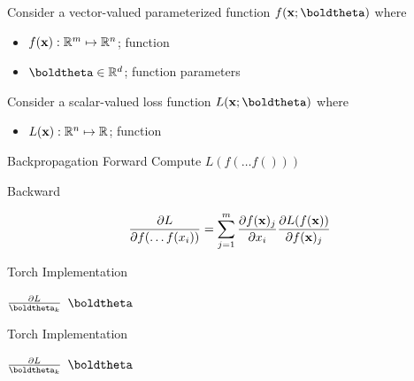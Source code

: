\documentclass{beamer}
\begin{document}
\begin{frame}
  Consider a vector-valued parameterized function  $f(\boldx;\boldtheta)$ where 
  
  \begin{itemize}
  \item $f(\mathbf{x}): \mathbb{R}^m \mapsto \mathbb{R}^n$; function
  \item $\boldtheta \in \reals^d$; function parameters 
  \end{itemize}
\end{frame}


\begin{frame}
  Consider a scalar-valued loss function  $L(\boldx;\boldtheta)$ where 
  
  \begin{itemize}
  \item $L(\mathbf{x}): \mathbb{R}^n \mapsto \mathbb{R}$; function
  \end{itemize}
\end{frame}

\begin{frame}{Backpropagation}
  Forward 
  Compute $L(f(\ldots f()))$


  Backward   

  \[ \frac{\partial L}{\partial f(\ldots f(x_i))  } = \sum_{j =1}^m \frac{\partial f(\mathbf{x})_j} {\partial  x_i} \frac{\partial L(f(\mathbf{x}))} {\partial f(\mathbf{x})_j}   \]
\end{frame}

\begin{frame}{Torch Implementation}
    $\frac{\partial L}{\boldtheta_k}$
    $\boldtheta$
\end{frame}

\begin{frame}{Torch Implementation}
    $\frac{\partial L}{\boldtheta_k}$
    $\boldtheta$
\end{frame}
\end{document}
